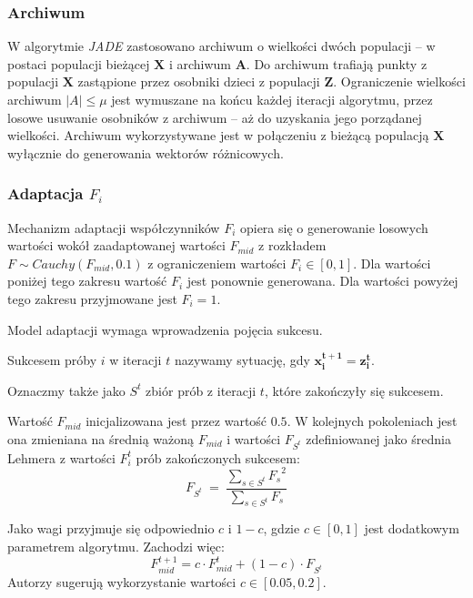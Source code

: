 \documentclass[12pt,a4paper]{report}
\begin{document}
{{{\begin{description}
\subsubsection{Archiwum}
\par{
W algorytmie \emph{JADE} zastosowano archiwum o wielkości dwóch populacji -- w postaci populacji bieżącej $\mathbf{X}$ i archiwum $\mathbf{A}$. Do archiwum trafiają punkty z populacji $\mathbf{X}$ zastąpione przez osobniki dzieci z populacji $\mathbf{Z}$. Ograniczenie wielkości archiwum $|A| \le \mu$ jest wymuszane na końcu każdej iteracji algorytmu, przez losowe usuwanie osobników z archiwum -- aż do uzyskania jego porządanej wielkości. Archiwum wykorzystywane jest w połączeniu z bieżącą populacją $\mathbf{X}$ wyłącznie do generowania wektorów różnicowych.
}
\subsubsection{Adaptacja $F_i$}
\par{
Mechanizm adaptacji współczynników $F_i$ opiera się o generowanie losowych wartości wokół zaadaptowanej wartości $F_{mid}$ z rozkładem $F \sim Cauchy(F_{mid}, 0.1)$ z ograniczeniem wartości $F_i \in [0, 1]$. Dla wartości poniżej tego zakresu wartość $F_i$ jest ponownie generowana. Dla wartości powyżej tego zakresu przyjmowane jest $F_i = 1$.
}
\par{
Model adaptacji wymaga wprowadzenia pojęcia sukcesu.
\par{
\begin{OptDefinition}
Sukcesem próby $i$ w iteracji $t$ nazywamy sytuację, gdy $\mathbf{x_i^{t+1} = z_i^t}$.
\end{OptDefinition}
}
Oznaczmy także jako $S^t$ zbiór prób z iteracji $t$, które zakończyły się sukcesem.
}
\par{
Wartość $F_{mid}$ inicjalizowana jest przez wartość $0.5$. W kolejnych pokoleniach jest ona zmieniana na średnią ważoną $F_{mid}$ i wartości $F_{S^t}$ zdefiniowanej jako średnia Lehmera z wartości $F_{i}^{t}$ prób zakończonych sukcesem:
}
\begin{equation}
F_{S^t}~=~\frac{\sum_{s \in S^t} {F_s}^2}{\sum_{s \in S^t} {F_s}}
\end{equation}

\par{
Jako wagi przyjmuje się odpowiednio $c$ i $1 - c$, gdzie $c \in [0,1]$ jest dodatkowym parametrem algorytmu. Zachodzi więc:
\begin{equation}
\label{eq:AdaptationJADEFormula}
F_{mid}^{t+1} = c \cdot F_{mid}^t + (1 - c) \cdot F_{S^t}
\end{equation}
Autorzy \cite{JADE} sugerują wykorzystanie wartości $c \in [0.05, 0.2]$.
}


\end{description}}}}
\end{document}
